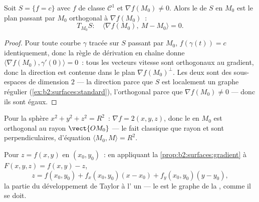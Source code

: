 \begin{proposition}\label{prop:b2:surfaces:gradient}
Soit $S = \{f = c\}$ avec $f$ de classe $\mathcal{C}^1$ et $\nabla
f(M_0) \neq 0$. Alors le  de $S$ en $M_0$ est le
plan passant par $M_0$ orthogonal à $\nabla f(M_0)$~:
\[
T_{M_0}S :\quad
\langle \nabla f(M_0),\ M - M_0\rangle = 0 .
\]
\end{proposition}

\begin{proof}
Pour toute courbe $\gamma$ tracée sur $S$ passant par $M_0$, $f(\gamma(t)) =
c$ identiquement, donc la règle de dérivation en chaîne donne $\langle
\nabla f(M_0), \gamma'(0)\rangle = 0$~: tous les vecteurs vitesse sont
orthogonaux au gradient, donc la direction  est contenue
dans le plan $\nabla f(M_0)^\perp$. Les deux sont des sous-espaces
de dimension $2$ --- la direction  parce que $S$ est
localement un graphe régulier (\cref{ex:b2:surfaces:standard}),
l'orthogonal parce que $\nabla f(M_0) \neq 0$ --- donc ils sont
égaux.
\end{proof}

\begin{example}\label{ex:b2:surfaces:spheretangent}
Pour la sphère $x^2 + y^2 + z^2 = R^2$~: $\nabla f = 2(x, y, z)$,
donc le  en $M_0$ est orthogonal au rayon
$\vect{OM_0}$ --- le fait classique que rayon et 
sont perpendiculaires, d'équation $\langle M_0, M\rangle = R^2$.
\end{example}

\begin{example}\label{ex:b2:surfaces:graphtangent}
Pour $z = f(x, y)$ en $(x_0, y_0)$~: en appliquant la
\cref{prop:b2:surfaces:gradient} à $F(x,y,z) = f(x,y) - z$,
\[
z = f(x_0, y_0)
+ f_x(x_0, y_0)(x - x_0)
+ f_y(x_0, y_0)(y - y_0) ,
\]
la partie  du développement de Taylor à l' un --- le
 est le graphe de la , comme il se doit.
\end{example}


